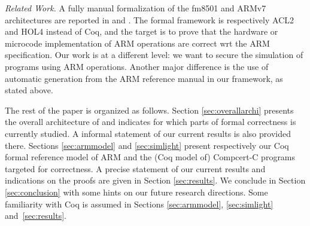 \smallskip
\emph{Related Work.}
A fully manual formalization of the fm8501 and ARMv7 architectures are reported
in \cite{fm8501} and \cite{FoxM10}. 
The formal framework is respectively ACL2 and HOL4 instead of Coq, 
and the target is to prove that the hardware or microcode implementation of 
ARM operations are correct wrt the ARM specification.
Our work is at a different level:
we want to secure the simulation of programs using ARM operations.
Another major difference is the use of automatic generation 
from the ARM reference manual in our framework,
as stated above.

\medskip
The rest of the paper is organized as follows.
Section \ref{sec:overallarchi}
presents the overall architecture of \simlight
and indicates for which parts of \simlight 
formal correctness is currently studied.
A informal statement of our current results is also
provided there.
Sections \ref{sec:armmodel} and \ref{sec:simlight}
present respectively our Coq formal reference model of ARM
and the (Coq model of) Compcert-C programs targeted for correctness.
A precise statement of our current results and indications on the proofs are 
given in Section \ref{sec:results}.
We conclude in Section \ref{sec:conclusion} with some hints on
our future research directions.
Some familiarity with Coq is assumed in 
Sections \ref{sec:armmodel}, \ref{sec:simlight} and~\ref{sec:results}.


